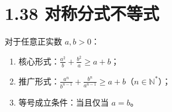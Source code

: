 \documentclass{article}
\begin{document}
\section*{1.38 对称分式不等式}
对于任意正实数 \( a,b>0 \)：
\begin{enumerate}
    \item 核心形式：\( \frac{a^2}{b}+\frac{b^2}{a} \geq a+b \)；
    \item 推广形式：\( \frac{a^n}{b^{n-1}}+\frac{b^n}{a^{n-1}} \geq a+b \)（\( n\in\mathbb{N}^* \)）；
    \item 等号成立条件：当且仅当 \( a=b \)。
\end{enumerate}
\end{document}
